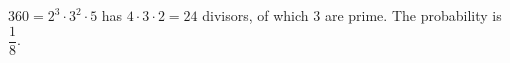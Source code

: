 $360=2^3\cdot3^2\cdot5$ has $4\cdot3\cdot2=24$ divisors, of which $3$ are prime. The probability is $\boxed{\dfrac18}$.
